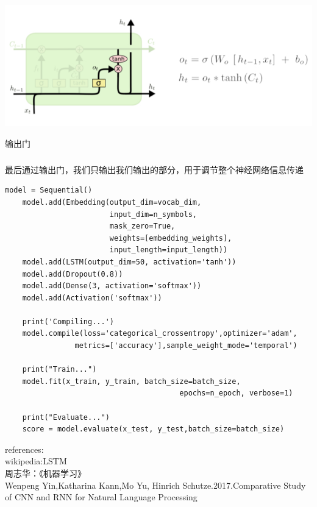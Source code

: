 \documentclass[UTF8]{article}
\begin{document}
\begin{center}
\includegraphics[width=0.8\linewidth]{4.PNG}
\end{center}
\centerline{输出门}
\subparagraph{}最后通过输出门，我们只输出我们输出的部分，用于调节整个神经网络信息传递






\lstset{language=python}
\begin{lstlisting}
model = Sequential()
    model.add(Embedding(output_dim=vocab_dim,
                        input_dim=n_symbols,
                        mask_zero=True,
                        weights=[embedding_weights],
                        input_length=input_length))
    model.add(LSTM(output_dim=50, activation='tanh'))
    model.add(Dropout(0.8))
    model.add(Dense(3, activation='softmax'))
    model.add(Activation('softmax'))

    print('Compiling...')
    model.compile(loss='categorical_crossentropy',optimizer='adam',
                metrics=['accuracy'],sample_weight_mode='temporal')

    print("Train...")
    model.fit(x_train, y_train, batch_size=batch_size,
                                        epochs=n_epoch, verbose=1)

    print("Evaluate...")
    score = model.evaluate(x_test, y_test,batch_size=batch_size)
\end{lstlisting}

references:\\
wikipedia:LSTM\\
周志华：《机器学习》\\
Wenpeng Yin,Katharina Kann,Mo Yu, Hinrich Schutze.2017.Comparative Study of CNN and RNN for Natural Language Processing  \\
\end{document}
